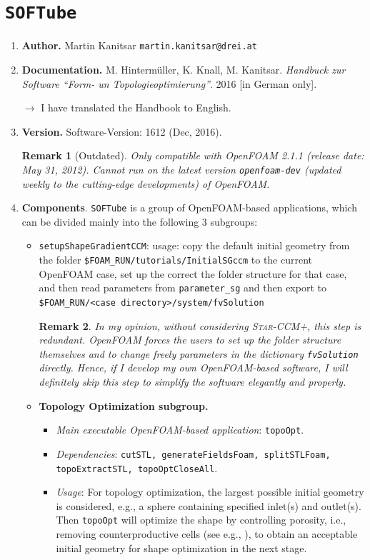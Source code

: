 \documentclass[onsided]{book}
\numberwithin{equation}{section}
\newtheorem{remark}{Remark}[section]
\begin{document}
\section{\texttt{SOFTube}}
\begin{enumerate}
    \item \textbf{Author.} Martin Kanitsar \texttt{martin.kanitsar@drei.at}
    \item \textbf{Documentation.} M. Hinterm\"uller, K. Knall, M. Kanitsar. \textit{Handbuck zur Software ``Form- un Topologieoptimierung''}. 2016 [in German only].
    
    $\to$ I have translated the Handbook to English.
    \item \textbf{Version.} Software-Version: 1612 (Dec, 2016).
    
    \begin{remark}[Outdated]
        Only compatible with OpenFOAM 2.1.1 (release date: May 31, 2012). Cannot run on the latest version \texttt{openfoam-dev} (updated \textit{weekly} to the cutting-edge developments) of OpenFOAM.
    \end{remark}    
    \item \textbf{Components}. \texttt{SOFTube} is a group of OpenFOAM-based applications, which can be divided mainly into the following 3 subgroups:
    \begin{itemize}
        \item \texttt{setupShapeGradientCCM}: usage: copy the default initial geometry from the folder \verb|$FOAM_RUN/tutorials/InitialSGccm| to the current OpenFOAM case, set up the correct the folder structure for that case, and then read parameters from \verb|parameter_sg| and then export to \verb|$FOAM_RUN/<case directory>/system/fvSolution|
        
        \begin{remark}
            In my opinion, without considering \textsc{Star-CCM+}, this step is redundant. OpenFOAM forces the users to set up the folder structure themselves and to change freely parameters in the dictionary \texttt{fvSolution} directly. Hence, if I develop my own OpenFOAM-based software, I will definitely skip this step to simplify the software elegantly and properly.
        \end{remark}
        \item \textbf{Topology Optimization subgroup.}
        \begin{itemize}
            \item \textit{Main executable OpenFOAM-based application}: \texttt{topoOpt}.
            \item \textit{Dependencies}: \texttt{cutSTL, generateFieldsFoam, splitSTLFoam, topoExtractSTL, topoOptCloseAll}.
            \item \textit{Usage}: For topology optimization, the largest possible initial geometry is considered, e.g., a sphere containing specified inlet(s) and outlet(s). Then \texttt{topoOpt} will optimize the shape by controlling porosity, i.e., removing counterproductive cells (see e.g., \cite{Othmer_Villiers_Weller2007,Othmer2008}), to obtain an acceptable initial geometry for shape optimization in the next stage.
            

\end{itemize}
\end{itemize}
\end{enumerate}
\end{document}
